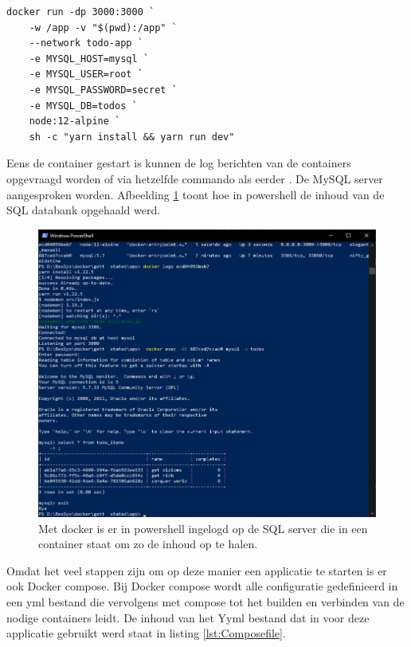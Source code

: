 \begin{lstlisting}
docker run -dp 3000:3000 `
    -w /app -v "$(pwd):/app" `
    --network todo-app `
    -e MYSQL_HOST=mysql `
    -e MYSQL_USER=root `
    -e MYSQL_PASSWORD=secret `
    -e MYSQL_DB=todos `
    node:12-alpine `
    sh -c "yarn install && yarn run dev"
\end{lstlisting}
Eens de container gestart is kunnen de log berichten van de containers opgevraagd worden of via hetzelfde commando als eerder . De MySQL server aangesproken worden. Afbeelding \ref{fig:powershellsql} toont hoe in powershell de inhoud van de SQL databank opgehaald werd.
\begin{figure}[h]
    \includegraphics[width=\linewidth]{img/sqlquery.png}
    \caption[Het aanspreken van een SQL server binnen een container]{Met docker is er in powershell ingelogd op de SQL server die in een container staat om zo de inhoud op te halen.}
    \label{fig:powershellsql}
    \centering
\end{figure}

Omdat het veel stappen zijn om op deze manier een applicatie te starten is er ook Docker compose. Bij Docker compose wordt alle configuratie gedefinieerd in een yml bestand die vervolgens met compose tot het builden en verbinden van de nodige containers leidt. De inhoud van het Yyml bestand dat in voor deze applicatie gebruikt werd staat in listing \ref{lst:Composefile}.

